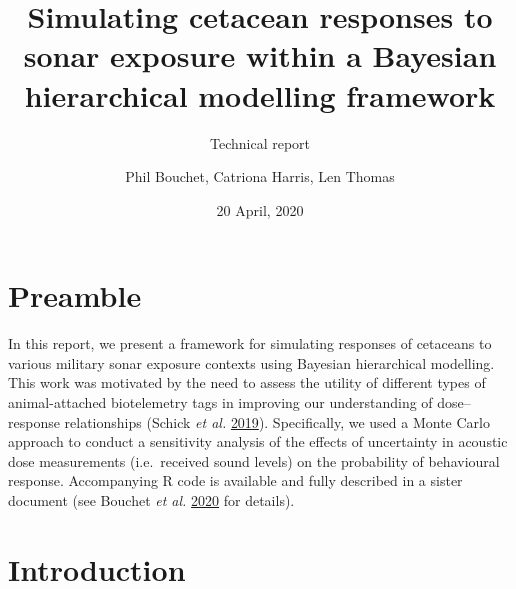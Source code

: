 \documentclass[
]{article}
\title{Simulating cetacean responses to sonar exposure within a Bayesian hierarchical modelling framework}
\subtitle{Technical report}
\author{Phil Bouchet, Catriona Harris, Len Thomas}
\date{20 April, 2020}
\begin{document}
\maketitle

{
\hypersetup{linkcolor=black}
\setcounter{tocdepth}{3}
\tableofcontents
}
\section{Preamble}

In this report, we present a framework for simulating responses of cetaceans to various military sonar exposure contexts using Bayesian hierarchical modelling. This work was motivated by the need to assess the utility of different types of animal-attached biotelemetry tags in improving our understanding of dose--response relationships (Schick \emph{et al.} \protect\hyperlink{ref-Schick2019}{2019}). Specifically, we used a Monte Carlo approach to conduct a sensitivity analysis of the effects of uncertainty in acoustic dose measurements (i.e.~received sound levels) on the probability of behavioural response. Accompanying R code is available and fully described in a sister document (see Bouchet \emph{et al.} \protect\hyperlink{ref-Bouchet2020b}{2020} for details).

\section{Introduction}
\end{document}
